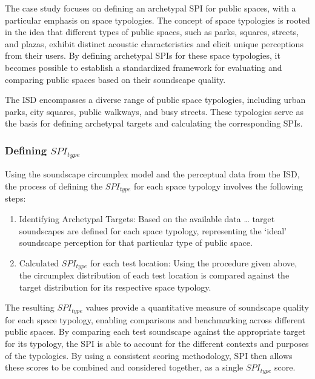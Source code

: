 \documentclass[
  authoryear,
  preprint,
  3p]{elsarticle}
\providecommand{\tightlist}{%
  \setlength{\itemsep}{0pt}\setlength{\parskip}{0pt}}\usepackage{longtable,booktabs,array}
\begin{document}
The case study focuses on defining an archetypal SPI for public spaces,
with a particular emphasis on space typologies. The concept of space
typologies is rooted in the idea that different types of public spaces,
such as parks, squares, streets, and plazas, exhibit distinct acoustic
characteristics and elicit unique perceptions from their users. By
defining archetypal SPIs for these space typologies, it becomes possible
to establish a standardized framework for evaluating and comparing
public spaces based on their soundscape quality.

The ISD encompasses a diverse range of public space typologies,
including urban parks, city squares, public walkways, and busy streets.
These typologies serve as the basis for defining archetypal targets and
calculating the corresponding SPIs.

\subsubsection{\texorpdfstring{Defining
\(SPI_{type}\)}{Defining SPI\_\{type\}}}\label{defining-spi_type}

Using the soundscape circumplex model and the perceptual data from the
ISD, the process of defining the \(SPI_{type}\) for each space typology
involves the following steps:

\begin{enumerate}
\def\labelenumi{\arabic{enumi}.}
\tightlist
\item
  Identifying Archetypal Targets: Based on the available data \ldots{}
  target soundscapes are defined for each space typology, representing
  the `ideal' soundscape perception for that particular type of public
  space.
\item
  Calculated \(SPI_{type}\) for each test location: Using the procedure
  given above, the circumplex distribution of each test location is
  compared against the target distribution for its respective space
  typology.
\end{enumerate}

The resulting \(SPI_{type}\) values provide a quantitative measure of
soundscape quality for each space typology, enabling comparisons and
benchmarking across different public spaces. By comparing each test
soundscape against the appropriate target for its typology, the SPI is
able to account for the different contexts and purposes of the
typologies. By using a consistent scoring methodology, SPI then allows
these scores to be combined and considered together, as a single
\(SPI_{type}\) score.
\end{document}

